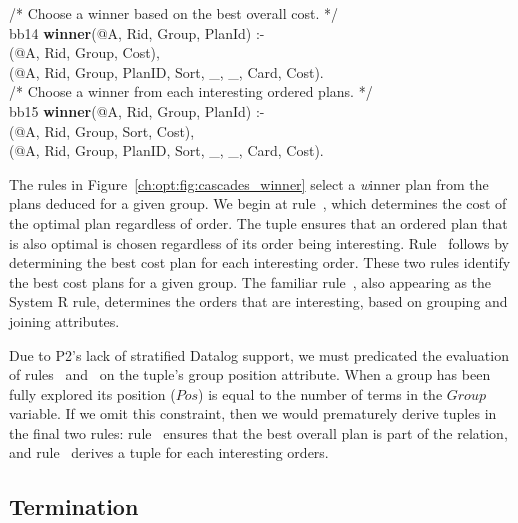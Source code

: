 \begin{figure*}
\begin{boxedminipage}{\linewidth}
/* Choose a winner based on the best overall cost. */ \\
bb14 {\bf winner}(@A, Rid, Group, PlanId) :- \\
(@A, Rid, Group, Cost), \\
(@A, Rid, Group, PlanID, Sort, \_, \_, Card, Cost). \\

/* Choose a winner from each interesting ordered plans. */ \\
bb15 {\bf winner}(@A, Rid, Group, PlanId) :- \\
(@A, Rid, Group, Sort, Cost), \\
(@A, Rid, Group, PlanID, Sort, \_, \_, Card, Cost).

\end{boxedminipage}
\caption{\label{ch:opt:fig:cascades_winner} Cascades winner selection rules.}
\end{figure*}

The rules in Figure~\ref{ch:opt:fig:cascades_winner} select a {\emph winner}
plan from the plans deduced for a given group.  We begin at rule~,
which determines the cost of the optimal plan regardless of order.  The
 tuple ensures that an ordered plan that is also optimal is
chosen regardless of its order being interesting.  Rule~ follows by
determining the best cost plan for each interesting order.  These two rules
identify the best cost plans for a given group.  The familiar rule~,
also appearing as the  System R rule, determines the orders that are
interesting, based on grouping and joining attributes.

Due to P2's lack of stratified Datalog support, we must predicated the
evaluation of rules~ and~ on the  tuple's group
position attribute.  When a group has been fully explored its 
position ($Pos$) is equal to the number of terms in the $Group$ variable.  If
we omit this constraint, then we would prematurely derive  tuples in
the final two rules: rule~ ensures that the best overall plan is part
of the  relation, and rule~ derives a  tuple for
each interesting orders.

\subsection{Termination}
\label{ch:opt:sec:cascadesend}

